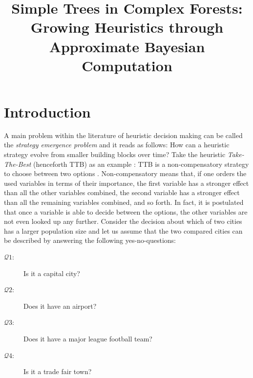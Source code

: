 \documentclass[a4paper,man, natbib]{apa6}
\title{Simple Trees in Complex Forests: Growing Heuristics through Approximate Bayesian Computation}
\begin{document}
\maketitle

\section{Introduction}
A main problem within the literature of heuristic decision making can be called the \emph{strategy emergence problem} and it reads as follows: How can a heuristic strategy evolve from smaller building blocks over time? Take the heuristic \emph{Take-The-Best} (henceforth TTB) as an example \citep{gigerenzer1999betting}: TTB is a non-compensatory strategy to choose between two options \citep{hoffrage1999people}. Non-compensatory means that, if one orders the used variables in terms of their importance, the first variable has a stronger effect than all the other variables combined, the second variable has a stronger effect than all the remaining variables combined, and so forth. In fact, it is postulated that once a variable is able to decide between the options, the other variables are not even looked up any further. Consider the decision about which of two cities has a larger population size and let us assume that the two compared cities can be described by answering the following yes-no-questions:
\begin{description}
		\item[$\mathcal{Q}1$:]Is it a capital city?
		\item[$\mathcal{Q}2$:] Does it have an airport?
		\item[$\mathcal{Q}3$:] Does it have a major league football team?
		\item[$\mathcal{Q}4$:] Is it a trade fair town?
\end{description}
\end{document}
